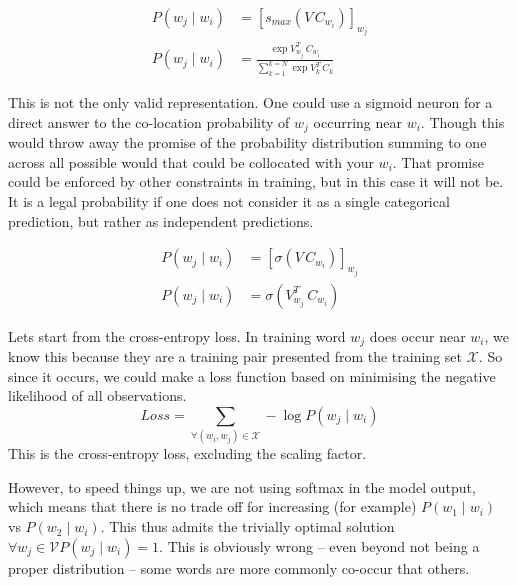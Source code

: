 \documentclass[parskip]{komatufte}
\begin{document}
\begin{align}
P(w_j \mid w_{i}) & = \left[ s_{max}(V\,C_{w_{i}}) \right]_{w_j} \\
P(w_j \mid w_{i}) & = \frac{\exp{V_{w_j}^T\,C_{w_{i}}}}{\sum_{k=1}^{k=N} \exp{V_k^T\,C_{k}}}
\end{align}



This is not the only valid representation.
One could use a sigmoid neuron for a direct answer to the co-location probability of $w_j$ occurring near $w_i$.
Though this would throw away the promise of the probability distribution summing to one across all possible would that could be collocated with your $w_i$.
That promise could be enforced by other constraints in training, but in this case it will not be.
It is a legal probability if one does not consider it as a single categorical prediction, but rather as independent predictions.

\begin{align}
P(w_j \mid w_{i}) & = \left[\sigma(V\,C_{w_{i}}) \right]_{w_j} \\
P(w_j \mid w_{i}) & = \sigma(V_{w_j}^T\,C_{w_{i}})
\end{align}


Lets start from the cross-entropy loss.
In training word $w_j$ does occur near $w_i$, we know this because they are a training pair presented from the training set $\mathcal{X}$.
So since it occurs, we could make a loss function based on minimising the negative likelihood of all observations.
\begin{equation}
Loss = \sum_{\forall (w_i,w_j)\in \mathcal{X}} -\log P(w_j\mid w_i)
\end{equation}
This is the cross-entropy loss, excluding the scaling factor.

However, to speed things up, we are not using softmax in the model output,
which means that there is no trade off for increasing (for example) $P(w_1\mid w_i)$ vs $P(w_2\mid w_i)$.
This thus admits the trivially optimal solution $\forall w_j\in \mathcal{V} P(w_j \mid w_i) = 1$.
This is obviously wrong -- even beyond not being a proper distribution -- some words are more commonly co-occur that others.
\end{document}
